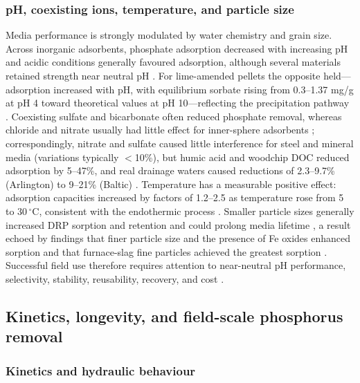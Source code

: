 \subsubsection{pH, coexisting ions, temperature, and particle size}

Media performance is strongly modulated by water chemistry and grain size. Across inorganic adsorbents, phosphate adsorption decreased with increasing pH and acidic conditions generally favoured adsorption, although several materials retained strength near neutral pH \parencite{Li2020}. For lime-amended pellets the opposite held---adsorption increased with pH, with equilibrium sorbate rising from 0.3--1.37 mg/g at pH 4 toward theoretical values at pH 10---reflecting the precipitation pathway \parencite{Li2017}. Coexisting sulfate and bicarbonate often reduced phosphate removal, whereas chloride and nitrate usually had little effect for inner-sphere adsorbents \parencite{Li2020}; correspondingly, nitrate and sulfate caused little interference for steel and mineral media (variations typically $<$10\%), but humic acid and woodchip DOC reduced adsorption by 5--47\%, and real drainage waters caused reductions of 2.3--9.7\% (Arlington) to 9--21\% (Baltic) \parencite{Sellner2019b}. Temperature has a measurable positive effect: adsorption capacities increased by factors of 1.2--2.5 as temperature rose from 5 to 30\,$^{\circ}$C, consistent with the endothermic process \parencite{Sellner2019b}. Smaller particle sizes generally increased DRP sorption and retention and could prolong media lifetime \parencite{Mendes2022}, a result echoed by findings that finer particle size and the presence of Fe oxides enhanced sorption \parencite{Pugliese2023} and that furnace-slag fine particles achieved the greatest sorption \parencite{Sanford2016}. Successful field use therefore requires attention to near-neutral pH performance, selectivity, stability, reusability, recovery, and cost \parencite{Li2020}.

\subsection{Kinetics, longevity, and field-scale phosphorus removal}

\subsubsection{Kinetics and hydraulic behaviour}

